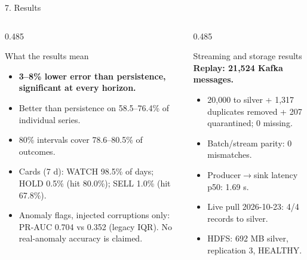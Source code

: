 \documentclass[aspectratio=169,10pt]{beamer}
\begin{document}
\begin{frame}{7. Results}
  \vspace{-0.1cm}
  \begin{columns}[T,onlytextwidth]
    \begin{column}{0.485\textwidth}
      \begin{block}{What the results mean}
        \footnotesize
        \begin{itemize}\scriptsize
          \item \textbf{\color{refGreen}3--8\% lower error than persistence, significant at every horizon.}
          \item Better than persistence on 58.5--76.4\% of individual series.
          \item 80\% intervals cover 78.6--80.5\% of outcomes.
          \item Cards (7 d): WATCH 98.5\% of days; HOLD 0.5\% (hit 80.0\%); SELL 1.0\% (hit 67.8\%).
          \item Anomaly flags, injected corruptions only: PR-AUC 0.704 vs 0.352 (legacy IQR). No real-anomaly accuracy is claimed.
        \end{itemize}
      \end{block}
    \end{column}

    \begin{column}{0.485\textwidth}
      \begin{block}{Streaming and storage results}
        \footnotesize
        \textbf{Replay: 21,524 Kafka messages.}
        \begin{itemize}\scriptsize
          \item 20,000 to silver + 1,317 duplicates removed + 207 quarantined; 0 missing.
          \item Batch/stream parity: 0 mismatches.
          \item Producer$\to$sink latency p50: 1.69 s.
          \item Live pull 2026-10-23: 4/4 records to silver.
          \item HDFS: 692 MB silver, replication 3, HEALTHY.
        \end{itemize}
      \end{block}
    \end{column}
  \end{columns}
\end{frame}
\end{document}
